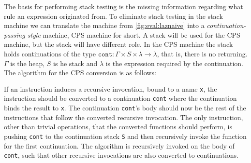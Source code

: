 The basis for performing stack testing is the missing information regarding what rule an expression originated from.
To eliminate stack testing in the stack machine we can translate the machine from \autoref{fig:eval:laznaive} into a \textit{continuation-passing style} machine, CPS machine for short.
A stack will be used for the CPS machine, but the stack will have different role.
In the CPS machine the stack holds continuations of the type $\texttt{cont}: \Gamma \times S \times \lambda \rightarrow \lambda$, that is, there is no returning.
$\Gamma$ is the heap, $S$ is he stack and $\lambda$ is the expression required by the continuation.
The algorithm for the CPS conversion is as follows:

If an instruction induces a recursive invocation, bound to a name \texttt{x}, the instruction should be converted to a continuation \texttt{cont} where the continuation binds the result to \texttt{x}.
The continuation \texttt{cont}'s body should now be the rest of the instructions that follow the converted recursive invocation.
The only instruction, other than trivial operations, that the converted functions should perform, is pushing \texttt{cont} to the continuation stack \texttt{S} and then recursively invoke the function for the first continuation.
The algorithm is recursively invoked on the body of \texttt{cont}, such that other recursive invocations are also converted to continuations.

